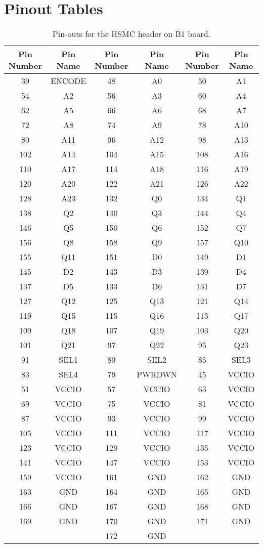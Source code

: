 \chapter{Pinout Tables}

\begin{table}[ht]
\centering
\begin{tabular}{|c|c||c|c||c|c|}
\hline
Pin Number & Pin Name & Pin Number & Pin Name & Pin Number & Pin Name\\
\hline
39 & ENCODE & 48 & A0 & 50 & A1 \\
54 & A2 & 56 & A3 & 60 & A4 \\
62 & A5 & 66 & A6 & 68 & A7 \\
72 & A8 & 74 & A9 & 78 & A10 \\
80 & A11 & 96 & A12 & 98 & A13 \\
102 & A14 & 104 & A15 & 108 & A16 \\
110 & A17 & 114 & A18 & 116 & A19 \\
120 & A20 & 122 & A21 & 126 & A22 \\
128 & A23 & 132 & Q0 & 134 & Q1 \\
138 & Q2 & 140 & Q3 & 144 & Q4 \\
146 & Q5 & 150 & Q6 & 152 & Q7 \\
156 & Q8 & 158 & Q9 & 157 & Q10 \\
155 & Q11 & 151 & D0 & 149 & D1 \\
145 & D2 & 143 & D3 & 139 & D4 \\
137 & D5 & 133 & D6 & 131 & D7 \\
127 & Q12 & 125 & Q13 & 121 & Q14 \\
119 & Q15 & 115 & Q16 & 113 & Q17 \\
109 & Q18 & 107 & Q19 & 103 & Q20 \\
101 & Q21 & 97 & Q22 & 95 & Q23 \\
91 & SEL1 & 89 & SEL2 & 85 & SEL3 \\
83 & SEL4 & 79 & PWRDWN & 45 & VCCIO \\
51 & VCCIO & 57 & VCCIO & 63 & VCCIO \\
69 & VCCIO & 75 & VCCIO & 81 & VCCIO \\
87 & VCCIO & 93 & VCCIO & 99 & VCCIO \\
105 & VCCIO & 111 & VCCIO & 117 & VCCIO \\
123 & VCCIO & 129 & VCCIO & 135 & VCCIO \\
141 & VCCIO & 147 & VCCIO & 153 & VCCIO \\
159 & VCCIO & 161 & GND & 162 & GND \\
163 & GND & 164 & GND & 165 & GND \\
166 & GND & 167 & GND & 168 & GND \\
169 & GND & 170 & GND & 171 & GND \\
& & 172 & GND & & \\
\hline
\end{tabular}
\caption{Pin-outs for the HSMC header on B1 board.}
\label{tab:b1_hsmc_pinout}
\end{table}

